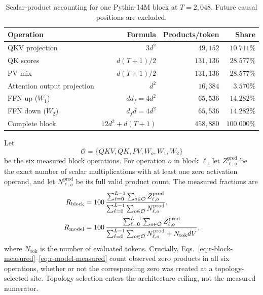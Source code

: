 \begin{table}[H]
\centering
\caption{Scalar-product accounting for one Pythia-14M block at $T=2{,}048$.
Future causal positions are excluded.}
\label{tab:block-accounting}
\small
\setlength{\tabcolsep}{5pt}
\begin{tabularx}{\linewidth}{@{}X r r r@{}}
\toprule
Operation & Formula & Products/token & Share \\
\midrule
QKV projection & $3d^2$ & $49{,}152$ & $10.711\%$ \\
QK scores & $d(T+1)/2$ & $131{,}136$ & $28.577\%$ \\
PV mix & $d(T+1)/2$ & $131{,}136$ & $28.577\%$ \\
Attention output projection & $d^2$ & $16{,}384$ & $3.570\%$ \\
FFN up ($W_1$) & $dd_f=4d^2$ & $65{,}536$ & $14.282\%$ \\
FFN down ($W_2$) & $d_f d=4d^2$ & $65{,}536$ & $14.282\%$ \\
\midrule
Complete block & $12d^2+d(T+1)$ & $458{,}880$ & $100.000\%$ \\
\bottomrule
\end{tabularx}
\end{table}

Let
\begin{equation}
    \mathcal O=\{QKV,QK,PV,W_o,W_1,W_2\}
    \label{eq:operation-set}
\end{equation}
be the six measured block operations. For operation $o$ in block $\ell$, let
$Z^{\mathrm{prod}}_{\ell,o}$ be the exact number of scalar multiplications
with at least one zero activation operand, and let
$N^{\mathrm{prod}}_{\ell,o}$ be its full valid product count. The measured
fractions are
\begin{align}
    R_{\mathrm{block}}
      &=100\,
        \frac{\sum_{\ell=0}^{L-1}\sum_{o\in\mathcal O}
                    Z^{\mathrm{prod}}_{\ell,o}}
             {\sum_{\ell=0}^{L-1}\sum_{o\in\mathcal O}
                    N^{\mathrm{prod}}_{\ell,o}},
    \label{eq:r-block-measured}\\
    R_{\mathrm{model}}
      &=100\,
        \frac{\sum_{\ell=0}^{L-1}\sum_{o\in\mathcal O}
                    Z^{\mathrm{prod}}_{\ell,o}}
             {\sum_{\ell=0}^{L-1}\sum_{o\in\mathcal O}
                    N^{\mathrm{prod}}_{\ell,o}
              +N_{\mathrm{tok}}dV},
    \label{eq:r-model-measured}
\end{align}
where $N_{\mathrm{tok}}$ is the number of evaluated tokens. Crucially,
Eqs.~\eqref{eq:r-block-measured}--\eqref{eq:r-model-measured} count observed
zero products in all six operations, whether or not the corresponding zero was
created at a topology-selected site. Topology selection enters the architecture
ceiling, not the measured numerator.

